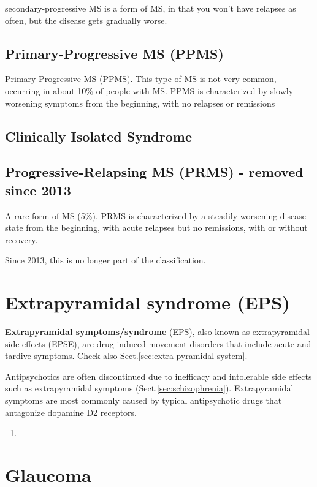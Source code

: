 secondary-progressive MS is a form of MS, in that you  won’t have relapses as often, but the disease gets gradually worse.

\subsection{Primary-Progressive MS (PPMS)}

Primary-Progressive MS (PPMS). This type of MS is not very common, occurring in
about 10\% of people with MS. PPMS is characterized by slowly worsening symptoms
from the beginning, with no relapses or remissions

\subsection{Clinically Isolated Syndrome}
\label{sec:MS-clinically-isolated-syndrome}

\subsection{Progressive-Relapsing MS (PRMS) - removed since 2013}

A rare form of MS (5\%), PRMS is characterized by a steadily worsening disease
state from the beginning, with acute relapses but no remissions, with or without
recovery.

Since 2013, this is no longer part of the classification.

\section{Extrapyramidal syndrome (EPS)}
\label{sec:EPS}
\label{sec:Extrapyramidal-syndrome}

{\bf Extrapyramidal symptoms/syndrome} (EPS), also known as extrapyramidal side
effects (EPSE), are drug-induced movement disorders that include acute and
tardive symptoms. Check also Sect.\ref{sec:extra-pyramidal-system}.

Antipsychotics are often discontinued due to inefficacy and intolerable side
effects such as extrapyramidal symptoms (Sect.\ref{sec:schizophrenia}).
Extrapyramidal symptoms are most commonly caused by typical antipsychotic drugs
that antagonize dopamine D2 receptors.
\begin{enumerate}
  \item 
\end{enumerate}


\section{Glaucoma}
\label{sec:glaucoma}

